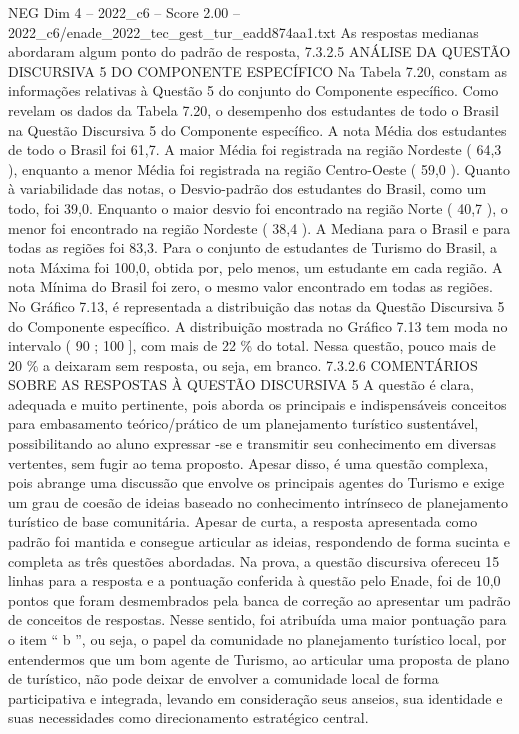 \begin{textsample}{NEG Dim 4 – 2022\_c6 – Score 2.00 – 2022\_c6/enade\_2022\_tec\_gest\_tur\_eadd874aa1.txt}
As respostas medianas abordaram algum ponto do padrão de resposta, 7.3.2.5 ANÁLISE DA QUESTÃO DISCURSIVA 5 DO COMPONENTE ESPECÍFICO Na Tabela 7.20, constam as informações relativas à Questão 5 do conjunto do Componente específico.
Como revelam os dados da Tabela 7.20, o desempenho dos estudantes de todo o Brasil na Questão Discursiva 5 do Componente específico.
A nota Média dos estudantes de todo o Brasil foi 61,7.
A maior Média foi registrada na região Nordeste ( 64,3 ), enquanto a menor Média foi registrada na região Centro-Oeste ( 59,0 ).
Quanto à variabilidade das notas, o Desvio-padrão dos estudantes do Brasil, como um todo, foi 39,0.
Enquanto o maior desvio foi encontrado na região Norte ( 40,7 ), o menor foi encontrado na região Nordeste ( 38,4 ).
A Mediana para o Brasil e para todas as regiões foi 83,3.
Para o conjunto de estudantes de Turismo do Brasil, a nota Máxima foi 100,0, obtida por, pelo menos, um estudante em cada região.
A nota Mínima do Brasil foi zero, o mesmo valor encontrado em todas as regiões.
No Gráfico 7.13, é representada a distribuição das notas da Questão Discursiva 5 do Componente específico.
A distribuição mostrada no Gráfico 7.13 tem moda no intervalo ( 90 ; 100 ], com mais de 22 \% do total.
Nessa questão, pouco mais de 20 \% a deixaram sem resposta, ou seja, em branco. 7.3.2.6 COMENTÁRIOS SOBRE AS RESPOSTAS À QUESTÃO DISCURSIVA 5 A questão é clara, adequada e muito pertinente, pois aborda os principais e indispensáveis conceitos para embasamento teórico/prático de um planejamento turístico sustentável, possibilitando ao aluno expressar -se e transmitir seu conhecimento em diversas vertentes, sem fugir ao tema proposto.
Apesar disso, é uma questão complexa, pois abrange uma discussão que envolve os principais agentes do Turismo e exige um grau de coesão de ideias baseado no conhecimento intrínseco de planejamento turístico de base comunitária.
Apesar de curta, a resposta apresentada como padrão foi mantida e consegue articular as ideias, respondendo de forma sucinta e completa as três questões abordadas.
Na prova, a questão discursiva ofereceu 15 linhas para a resposta e a pontuação conferida à questão pelo Enade, foi de 10,0 pontos que foram desmembrados pela banca de correção ao apresentar um padrão de conceitos de respostas.
Nesse sentido, foi atribuída uma maior pontuação para o item “ b ”, ou seja, o papel da comunidade no planejamento turístico local, por entendermos que um bom agente de Turismo, ao articular uma proposta de plano de turístico, não pode deixar de envolver a comunidade local de forma participativa e integrada, levando em consideração seus anseios, sua identidade e suas necessidades como direcionamento estratégico central.

\end{textsample}

